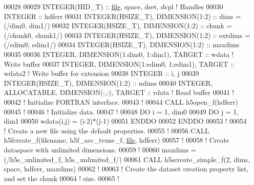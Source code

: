 \begin{DoxyCode}
00028 
00029   \textcolor{keywordtype}{INTEGER(HID\_T)}  :: \hyperlink{structfile}{file}, space, dset, dcpl \textcolor{comment}{! Handles}
00030   \textcolor{keywordtype}{INTEGER}         :: hdferr
00031   \textcolor{keywordtype}{INTEGER(HSIZE\_T)}, \textcolor{keywordtype}{DIMENSION(1:2)} :: dims = (/dim0, dim1/)
00032   \textcolor{keywordtype}{INTEGER(HSIZE\_T)}, \textcolor{keywordtype}{DIMENSION(1:2)} :: chunk =(/chunk0, chunk1/)
00033   \textcolor{keywordtype}{INTEGER(HSIZE\_T)}, \textcolor{keywordtype}{DIMENSION(1:2)} :: extdims =(/edim0, edim1/)
00034   \textcolor{keywordtype}{INTEGER(HSIZE\_T)}, \textcolor{keywordtype}{DIMENSION(1:2)} :: maxdims
00035 
00036   \textcolor{keywordtype}{INTEGER}, \textcolor{keywordtype}{DIMENSION(1:dim0, 1:dim1)}, \textcolor{keywordtype}{TARGET} :: wdata \textcolor{comment}{! Write buffer}
00037   \textcolor{keywordtype}{INTEGER}, \textcolor{keywordtype}{DIMENSION(1:edim0, 1:edim1)}, \textcolor{keywordtype}{TARGET} :: wdata2 \textcolor{comment}{! Write buffer for extension}
00038   \textcolor{keywordtype}{INTEGER} :: i, j
00039   \textcolor{keywordtype}{INTEGER(HSIZE\_T)}, \textcolor{keywordtype}{DIMENSION(1:2)} :: ndims
00040   \textcolor{keywordtype}{INTEGER}, \textcolor{keywordtype}{ALLOCATABLE}, \textcolor{keywordtype}{DIMENSION(:,:)}, \textcolor{keywordtype}{TARGET} :: rdata    \textcolor{comment}{! Read buffer}
00041   \textcolor{comment}{!}
00042   \textcolor{comment}{! Initialize FORTRAN interface.}
00043   \textcolor{comment}{!}
00044   \textcolor{keyword}{CALL }h5open\_f(hdferr)
00045   \textcolor{comment}{!}
00046   \textcolor{comment}{! Initialize data.}
00047   \textcolor{comment}{!}
00048   \textcolor{keywordflow}{DO} i = 1, dim0
00049      \textcolor{keywordflow}{DO} j = 1, dim1
00050         wdata(i,j) = (i-2)*(j-1)
00051 \textcolor{keywordflow}{     ENDDO}
00052 \textcolor{keywordflow}{  ENDDO}
00053   \textcolor{comment}{!}
00054   \textcolor{comment}{! Create a new file using the default properties.}
00055   \textcolor{comment}{!}
00056   \textcolor{keyword}{CALL }h5fcreate\_f(filename, h5f\_acc\_trunc\_f, \hyperlink{structfile}{file}, hdferr)
00057   \textcolor{comment}{!}
00058   \textcolor{comment}{! Create dataspace with unlimited dimensions.}
00059   \textcolor{comment}{!}
00060   maxdims = (/h5s\_unlimited\_f, h5s\_unlimited\_f/)
00061   \textcolor{keyword}{CALL }h5screate\_simple\_f(2, dims, space, hdferr, maxdims)
00062   \textcolor{comment}{!}
00063   \textcolor{comment}{! Create the dataset creation property list, and set the chunk}
00064   \textcolor{comment}{! size.}
00065   \textcolor{comment}{!}

\end{DoxyCode}
